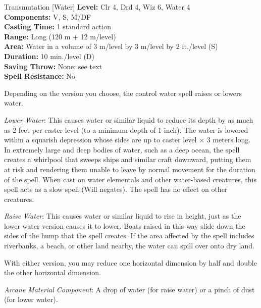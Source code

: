 {Transmutation [Water]}
{
	\textbf{Level:}
	Clr 4, Drd 4, Wiz 6, Water 4\\
	\textbf{Components:}
	V, S, M/DF\\
	\textbf{Casting Time:}
	1 standard action\\
	\textbf{Range:}
	Long (120 m + 12 m/level)\\
	\textbf{Area:}
	Water in a volume of 3 m/level by 3 m/level by 2 ft./level (S)\\
	\textbf{Duration:}
	10 min./level (D)\\
	\textbf{Saving Throw:}
	None; see text\\
	\textbf{Spell Resistance:}
	No\\
}
{
	Depending on the version you choose, the control water spell raises or lowers water.

	\textit{Lower Water}:
	This causes water or similar liquid to reduce its depth by as much as 2 feet per caster level (to a minimum depth of 1 inch). The water is lowered within a squarish depression whose sides are up to caster level $\times$ 3 meters long. In extremely large and deep bodies of water, such as a deep ocean, the spell creates a whirlpool that sweeps ships and similar craft downward, putting them at risk and rendering them unable to leave by normal movement for the duration of the spell. When cast on water elementals and other water-based creatures, this spell acts as a slow spell (Will negates). The spell has no effect on other creatures.

	\textit{Raise Water}:
	This causes water or similar liquid to rise in height, just as the lower water version causes it to lower. Boats raised in this way slide down the sides of the hump that the spell creates. If the area affected by the spell includes riverbanks, a beach, or other land nearby, the water can spill over onto dry land.

	With either version, you may reduce one horizontal dimension by half and double the other horizontal dimension.

	\textit{Arcane Material Component}:
	A drop of water (for raise water) or a pinch of dust (for lower water).

}
